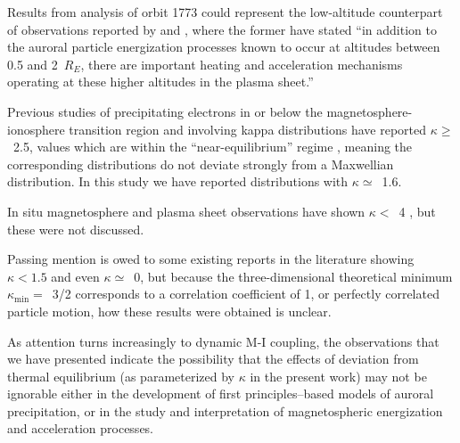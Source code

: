   Results from analysis of orbit 1773 could represent the
  low-altitude counterpart of observations reported by
  \citet{Wygant2002} and \citet{Schriver2003}, where the former have
  stated ``in addition to the auroral particle energization processes
  known to occur at altitudes between 0.5 and 2~$R_E$, there are
  important heating and acceleration mechanisms operating at these
  higher altitudes in the plasma sheet.''

  Previous studies of precipitating electrons in or below the
  magnetosphere-ionosphere transition region and involving kappa
  distributions \citep{Olsson1998,Ogasawara2006,Kaeppler2014a} have
  reported $\kappa \geq$~2.5, values which are within the
  ``near-equilibrium'' regime \citep{Livadiotis2010}, meaning the
  corresponding distributions do not deviate strongly from a
  Maxwellian distribution. In this study we have reported
  distributions with $\kappa \simeq$~1.6.

  In situ magnetosphere and plasma sheet observations
  \citet{Christon1989,Christon1991,Kletzing2003} have shown $\kappa
  <$~4 , but these were not discussed.

  Passing mention is owed to some existing reports in the literature
  showing $\kappa < 1.5$ and even $\kappa \simeq$~0, but because the
  three-dimensional theoretical minimum $\kappa_{\mathrm{min}} =$~3/2
  corresponds to a correlation coefficient of 1, or perfectly
  correlated particle motion, how these results were obtained is
  unclear.

  As attention turns increasingly to dynamic M-I coupling, the
  observations that we have presented indicate the possibility that
  the effects of deviation from thermal equilibrium (as parameterized
  by $\kappa$ in the present work) may not be ignorable either in the
  development of first principles--based models of auroral
  precipitation, or in the study and interpretation of magnetospheric
  energization and acceleration processes.

  




